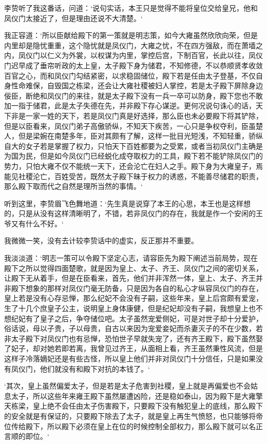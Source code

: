 李贽听了我这番话，问道：‘说句实话，本王只是觉得不能将皇位交给皇兄，他和凤仪门太接近了，但是理由还说不大清楚。‘

我正容道：‘所以臣献给殿下的第一策就是明志策，如今大雍虽然欣欣向荣，但是内里却是隐忧重重，这个隐忧就是凤仪门，大雍之忧，不在四方强敌，而在萧墙之内，凤仪门以仁义为外裳，以权谋为内里，掌控后宫，下制百官，长此以往，凤仪门迟早成了垂帘听政的太上皇，太子殿下身为储君，不知修德，不以恭顺贤孝收敛百官之心，而和凤仪门勾结紧密，以求稳固储位，殿下若是任由太子登基，不仅自身性命难保，自毁国之栋梁，还会让大雍社稷被妇人掌控，若是太子殿下屏除身边佞臣，断绝和凤仪门的来往，就是太子殿下没有一兵一卒可以防身，殿下您也不敢加一指于储君，此是太子失德在先，并非殿下存心谋逆。更何况说句诛心的话，天下非是一家一姓的天下，若是凤仪门真是好选择，那么臣也未必要殿下将其铲除，但是以臣看来，凤仪门弟子高傲骄纵，不知天下疾苦，一心只是争权夺利，臣虽楚人，但是梁婉在南楚多年，臣对其颇有了解，这样一批目光短浅，不知轻重，骄纵自大的女子若是掌握了权力，只怕天下百姓都要为之受累，或者当初凤仪门主确是为国为民，但是如今凤仪门已经蜕化成夺取权力的工具，殿下若不能铲除凤仪门的势力，只怕大雍不仅不能统一天下，还会沦亡在妇人之手。殿下身为大雍皇子，焉能见社稷沦亡，百姓受苦，既然太子殿下昧于权力的诱惑，不能善尽储君的职责，那么殿下取而代之自然是理所当然的事情。‘

听到这里，李贽眉飞色舞地道：‘先生真是说穿了本王的心思，本王也是这样想的，只是从没有这样清晰明了，不错，若非凤仪门的存在，我就是作一个安闲的王爷又有什么不好。‘

我微微一笑，没有去计较李贽话中的虚实，反正那并不重要。

我淡淡道：‘明志一策可以令殿下坚定心志，请容臣先为殿下阐述当前局势，现在殿下之所以觉得四面楚歌，就是因为皇上、太子、齐王、凤仪门之间的密切关系，让殿下无从着手，但是在臣看来，首先，他们并非浑然一体，皇上、太子、齐王并非殿下想象的那样对凤仪门毫无防备，只是因为各自的私心才纵容凤仪门的存在，皇上若是没有心存忌惮，那么纪妃不会没有子嗣，这些年来，皇上后宫颇有爱宠，生了十几个庶皇子公主，说明皇上身体康健，但是纪妃却没有子嗣，我想皇上也不想纪妃有了皇子之后，争夺储位吧。太子虽然宠爱侧妃，可是对世子却十分爱护，俗话说，母以子贵，子以母贵，自古以来因为宠爱妾妃而杀妻灭子的不在少数，若非太子殿下对凤仪门也有忌惮，恐怕世子早就失宠了，还有齐王殿下，殿下虽然娶了妃子，却对她若即若离，我曾见过齐王，从面相上看，齐王虽然秉性风流，但是这样子冷落嫡妃还是有些古怪，所以皇上他们并非对凤仪门十分信任，只是如果没有凤仪门，他们就没有和殿下对抗的本钱了。‘

‘其次，皇上虽然偏爱太子，但是若是太子危害到社稷，皇上就是再偏爱也不会姑息太子，所以这些年来雍王殿下虽然屡遭凶险，还是稳如泰山，因为殿下是大雍擎天栋梁，皇上绝不会任由太子伤害殿下，只要殿下没有触犯皇上的底线，那么殿下的安全就是有保证的，只要殿下除去了太子，就是皇上再生气愤怒，也只能够将帝位传给殿下，所以殿下必须在皇上在位的时候控制全部权力，那么殿下就可以名正言顺的即位。‘

